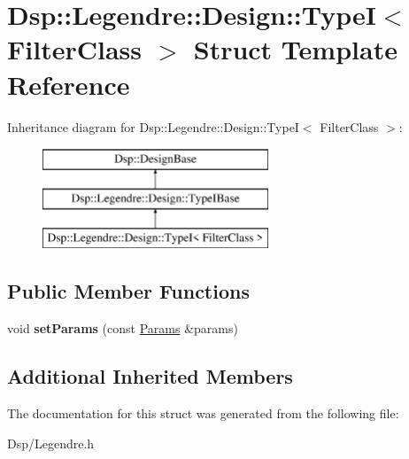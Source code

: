 \hypertarget{structDsp_1_1Legendre_1_1Design_1_1TypeI}{\section{Dsp\-:\-:Legendre\-:\-:Design\-:\-:Type\-I$<$ Filter\-Class $>$ Struct Template Reference}
\label{structDsp_1_1Legendre_1_1Design_1_1TypeI}
}
Inheritance diagram for Dsp\-:\-:Legendre\-:\-:Design\-:\-:Type\-I$<$ Filter\-Class $>$\-:\begin{figure}[H]
\begin{center}
\leavevmode
\includegraphics[height=3.000000cm]{structDsp_1_1Legendre_1_1Design_1_1TypeI}
\end{center}
\end{figure}
\subsection*{Public Member Functions}
\begin{DoxyCompactItemize}
\item 
\hypertarget{structDsp_1_1Legendre_1_1Design_1_1TypeI_a44ab3f3d2c92efbee207ef703cee5c4d}{void {\bfseries set\-Params} (const \hyperlink{structDsp_1_1Params}{Params} \&params)}\label{structDsp_1_1Legendre_1_1Design_1_1TypeI_a44ab3f3d2c92efbee207ef703cee5c4d}

\end{DoxyCompactItemize}
\subsection*{Additional Inherited Members}


The documentation for this struct was generated from the following file\-:\begin{DoxyCompactItemize}
\item 
Dsp/Legendre.\-h\end{DoxyCompactItemize}
